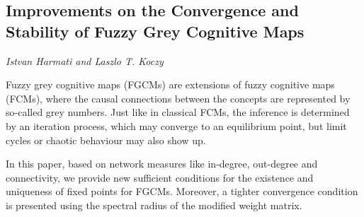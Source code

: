 \documentclass[../booklet.tex]{subfiles}
\begin{document}
\subsection[Improvements on the Convergence and Stability of Fuzzy Grey Cognitive Maps. {\it Istvan Harmati and Laszlo T. Koczy}]{Improvements on the Convergence and Stability of Fuzzy Grey Cognitive Maps}
 

\begin{center}
  {\it Istvan Harmati and Laszlo T. Koczy}
\end{center}



Fuzzy grey cognitive maps (FGCMs) are extensions of fuzzy cognitive maps (FCMs), where the causal connections between the concepts are represented by so-called grey numbers.  Just like in classical FCMs, the inference is determined by an iteration process, which may converge to an equilibrium point, but limit cycles or chaotic behaviour may also show up.

In this paper, based on network measures like in-degree, out-degree and connectivity, we provide new sufficient conditions for the existence and uniqueness of fixed points for FGCMs. Moreover, a tighter convergence condition is presented using the spectral radius of the modified weight matrix.

\end{document}
